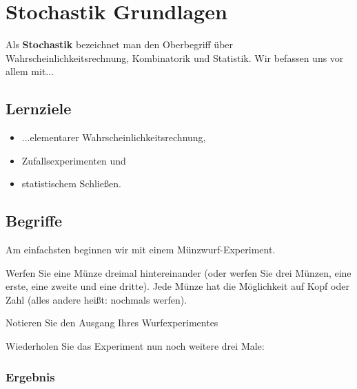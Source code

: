 
\section{Stochastik Grundlagen}


Als \textbf{Stochastik} bezeichnet man den Oberbegriff über
Wahrscheinlichkeitsrechnung, Kombinatorik und Statistik. Wir befassen
uns vor allem mit...

\subsection{Lernziele}
\begin{itemize}
	\item ...elementarer Wahrscheinlichkeitsrechnung,
	\item Zufallsexperimenten und
	\item{statistischem Schließen.}
\end{itemize}


\subsection{Begriffe}
Am einfachsten beginnen wir mit einem Münzwurf-Experiment.

Werfen Sie eine Münze dreimal hintereinander (oder werfen Sie drei
Münzen, eine erste, eine zweite und eine dritte). Jede Münze hat die
Möglichkeit auf Kopf oder Zahl (alles andere heißt: nochmals werfen).

Notieren Sie den Ausgang Ihres Wurfexperimentes


\TRAINER{\vspace{24mm}}

Wiederholen Sie das Experiment nun noch weitere drei Male:



\newpage



\subsubsection{Ergebnis}

